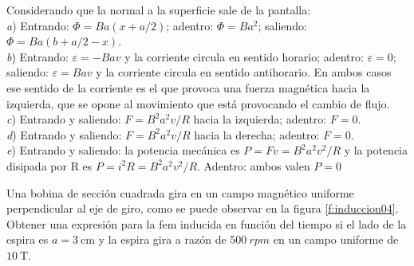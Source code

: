 \begin{Answer}
    \begin{minipage}[t]{.4\textwidth}
        Considerando que la normal a la superficie sale de la pantalla:\\ \textit{a}) Entrando: $\Phi = Ba(x+a/2)$; adentro: $\Phi = Ba^2$; saliendo: $\Phi = Ba(b+a/2-x)$.\\ \textit{b}) Entrando: $\varepsilon = -Bav$ y la corriente circula en sentido horario; adentro: $\varepsilon = 0$; saliendo: $\varepsilon = Bav$ y la corriente circula en sentido antihorario. En ambos casos ese sentido de la corriente es el que provoca una fuerza magnética hacia la izquierda, que se opone al movimiento que está provocando el cambio de flujo.\\ \textit{c}) Entrando y saliendo: $F = B^2a^2v/R$ hacia la izquierda; adentro: $F=0$.\\ \textit{d}) Entrando y saliendo: $F = B^2a^2v/R$ hacia la derecha; adentro: $F=0$.\\ \textit{e}) Entrando y saliendo: la potencia mecánica es $P = Fv = B^2a^2v^2/R$ y la potencia disipada por R es $P = i^2R = B^2a^2v^2/R$. Adentro: ambos valen $P=0$
    \end{minipage}
\end{Answer}
%
\begin{center}
\end{center}
%
\begin{Exercise}\label{p:induccion04}
    Una bobina de sección cuadrada gira en un campo magnético uniforme perpendicular al eje de giro, como se puede observar en la figura \ref{f:induccion04}. Obtener una expresión para la fem inducida en función del tiempo si el lado de la espira es $a = \SI{3}{\centi\metre}$ y la espira gira a razón de $\SI{500}{rpm}$ en un campo uniforme de $\SI{10}{\tesla}$.
\end{Exercise}
